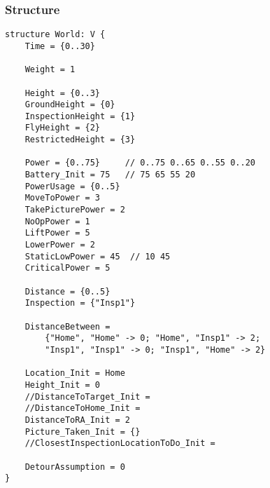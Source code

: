 \documentclass[12pt]{extarticle}
\begin{document}
\subsubsection*{Structure}
\begin{lstlisting}[basicstyle=\tiny]
structure World: V {
    Time = {0..30}
    
    Weight = 1
    
    Height = {0..3}
    GroundHeight = {0}
    InspectionHeight = {1}
    FlyHeight = {2}
    RestrictedHeight = {3}

    Power = {0..75}     // 0..75 0..65 0..55 0..20
    Battery_Init = 75   // 75 65 55 20
    PowerUsage = {0..5}
    MoveToPower = 3
    TakePicturePower = 2
    NoOpPower = 1
    LiftPower = 5
    LowerPower = 2
    StaticLowPower = 45  // 10 45
    CriticalPower = 5
    
    Distance = {0..5}
    Inspection = {"Insp1"}
    
    DistanceBetween =
    	{"Home", "Home" -> 0; "Home", "Insp1" -> 2;
        "Insp1", "Insp1" -> 0; "Insp1", "Home" -> 2}
    
    Location_Init = Home
    Height_Init = 0
    //DistanceToTarget_Init =
    //DistanceToHome_Init =
    DistanceToRA_Init = 2
    Picture_Taken_Init = {}
    //ClosestInspectionLocationToDo_Init =
    
    DetourAssumption = 0
}
\end{lstlisting}
\vspace{3mm}
\end{document}

